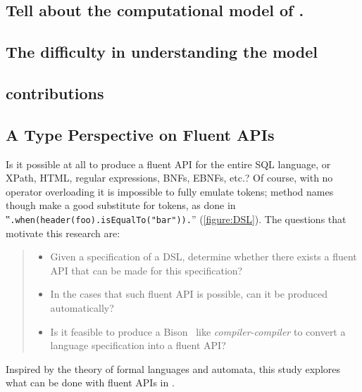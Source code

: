 \subsection{Tell about the computational model of \CC.}

\subsection{The difficulty in understanding the \Java model}

\subsection{contributions}

\subsection{A Type Perspective on Fluent APIs}
Is it possible at all to produce a fluent API for the entire SQL language, or
XPath, HTML, regular expressions, BNFs, EBNFs, etc.?  Of course, with no
operator overloading it is impossible to fully emulate tokens; method names
though make a good substitute for tokens, as done in
‟\lstinline{.when(header(foo).isEqualTo("bar")).}” (\cref{figure:DSL}).  The
questions that motivate this research are:

\begin{quote}
  \begin{itemize}
    \item Given a specification of a DSL, determine whether there exists
        a fluent API that can be made for this specification?
    \item In the cases that such fluent API is possible,
      can it be produced automatically?
    \item Is it feasible to produce a Bison~\cite{Bison:manual}
        like \emph{compiler-compiler}
        to convert a language specification into a fluent API?
  \end{itemize}
\end{quote}

Inspired by the theory of formal languages and automata,
  this study explores what can be done with fluent APIs in \Java.

